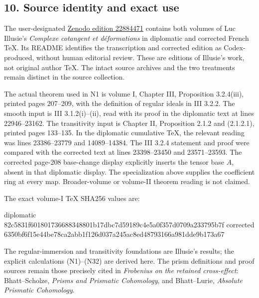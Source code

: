 \documentclass[
]{article}
\newenvironment{Shaded}{}{}
\newcommand{\NormalTok}[1]{#1}
\begin{document}
\subsection{10. Source identity and exact
use}\label{source-identity-and-exact-use}

The user-designated \href{https://zenodo.org/records/22884471}{Zenodo
edition 22884471} contains both volumes of Luc Illusie's \emph{Complexe
cotangent et déformations} in diplomatic and corrected French TeX. Its
README identifies the transcription and corrected edition as
Codex-produced, without human editorial review. These are editions of
Illusie's work, not original author TeX. The intact source archives and
the two treatments remain distinct in the source collection.

The actual theorem used in N1 is volume I, Chapter III, Proposition
3.2.4(iii), printed pages 207--209, with the definition of regular
ideals in III 3.2.2. The smooth input is III 3.1.2(i)--(ii), read with
its proof in the diplomatic text at lines 22946--23162. The transitivity
input is Chapter II, Proposition 2.1.2 and (2.1.2.1), printed pages
133--135. In the diplomatic cumulative TeX, the relevant reading was
lines 23386--23779 and 14089--14384. The III 3.2.4 statement and proof
were compared with the corrected text at lines 23398--23450 and
23571--23593. The corrected page-208 base-change display explicitly
inserts the tensor base \(A\), absent in that diplomatic display. The
specialization above supplies the coefficient ring at every map.
Broader-volume or volume-II theorem reading is not claimed.

The exact volume-I TeX SHA256 values are:

\begin{Shaded}
\begin{Highlighting}[]
\NormalTok{diplomatic}
\NormalTok{82c5831f601801736688348801b17dbc7d59189c4e5a0f357d0709a233795b7f}
\NormalTok{corrected}
\NormalTok{6350bf6f15e44be78ca2abb1f126d037a245ac8ed48793166a981dde9b173a67}
\end{Highlighting}
\end{Shaded}

The regular-immersion and transitivity foundations are Illusie's
results; the explicit calculations (N1)--(N32) are derived here. The
prism definitions and proof sources remain those precisely cited in
\emph{Frobenius on the retained cross-effect}: Bhatt--Scholze,
\emph{Prisms and Prismatic Cohomology}, and Bhatt--Lurie, \emph{Absolute
Prismatic Cohomology}.
\end{document}
